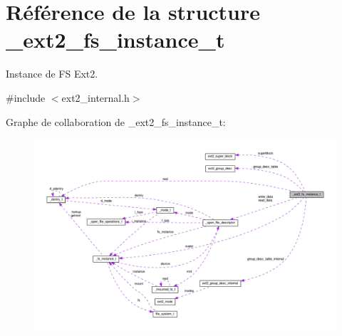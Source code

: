 \hypertarget{struct__ext2__fs__instance__t}{\section{Référence de la structure \+\_\+ext2\+\_\+fs\+\_\+instance\+\_\+t}
\label{struct__ext2__fs__instance__t}
}


Instance de F\+S Ext2.  




{\ttfamily \#include $<$ext2\+\_\+internal.\+h$>$}



Graphe de collaboration de \+\_\+ext2\+\_\+fs\+\_\+instance\+\_\+t\+:
\nopagebreak
\begin{figure}[H]
\begin{center}
\leavevmode
\includegraphics[width=350pt]{struct__ext2__fs__instance__t__coll__graph}
\end{center}
\end{figure}
